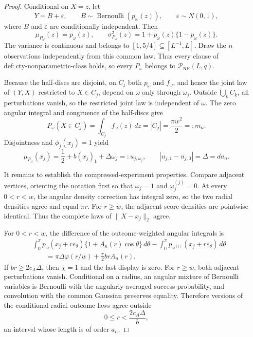 \documentclass{article}
\begin{document}
\begin{proof}
Conditional on \(X=z\), let
\[
 Y=B+\varepsilon,
 \qquad
 B\sim\operatorname{Bernoulli}(p_\omega(z)),
 \qquad
 \varepsilon\sim N(0,1),
\]
where \(B\) and \(\varepsilon\) are conditionally independent.  Then
\[
 \mu_{P_\omega}(z)=p_\omega(z),
 \qquad
 \sigma_{P_\omega}^2(z)=1+p_\omega(z)\{1-p_\omega(z)\}.
\]
The variance is continuous and belongs to \([1,5/4]\subseteq[L^{-1},L]\).  Draw the \(n\) observations independently from this common law.  Thus every clause of \(\mathrm{def:cty\text{-}nonparametric\text{-}class}\) holds, so every \(P_\omega\) belongs to \(\mathcal P_{\mathrm{NP}}(L,q)\).

Because the half-discs are disjoint, on \(C_j\) both \(p_\omega\) and \(f_\omega\), and hence the joint law of \((Y,X)\) restricted to \(X\in C_j\), depend on \(\omega\) only through \(\omega_j\).  Outside \(\bigcup_k C_k\), all perturbations vanish, so the restricted joint law is independent of \(\omega\).  The zero angular integral and congruence of the half-discs give
\[
 P_\omega(X\in C_j)=\int_{C_j}f_\omega(z)\,dz
 =|C_j|=\frac{\pi w^2}{2}=:m_n.
\]
Disjointness and \(\phi_j(x_j)=1\) yield
\[
 \mu_{P_\omega}(x_j)=\frac12+b(x_j)_1+\Delta\omega_j
 =:u_{j,\omega_j},
 \qquad |u_{j,1}-u_{j,0}|=\Delta=d a_n.
\]

It remains to establish the compressed-experiment properties.  Compare adjacent vertices, orienting the notation first so that \(\omega_j=1\) and \(\omega_j^{(j)}=0\).  At every \(0<r<w\), the angular density correction has integral zero, so the two radial densities agree and equal \(\pi r\).  For \(r\geq w\), the adjacent score densities are pointwise identical.  Thus the complete laws of \(\lVert X-x_j\rVert_2\) agree.

For \(0<r<w\), the difference of the outcome-weighted angular integrals is
\[
\begin{aligned}
 &\int_0^\pi p_\omega(x_j+re_\theta)
 \{1+A_n(r)\cos\theta\}\,d\theta
 -\int_0^\pi p_{\omega^{(j)}}(x_j+re_\theta)\,d\theta\\
 &\qquad=\pi\Delta\varphi(r/w)+\frac\pi2brA_n(r).
\end{aligned}
\]
If \(br\geq2c_A\Delta\), then \(\chi=1\) and the last display is zero.  For \(r\geq w\), both adjacent perturbations vanish.  Conditional on a radius, an angular mixture of Bernoulli variables is Bernoulli with the angularly averaged success probability, and convolution with the common Gaussian preserves equality.  Therefore versions of the conditional radial outcome laws agree outside
\[
 0\leq r<\frac{2c_A\Delta}{b},
\]
an interval whose length is of order \(a_n\).


\end{proof}
\end{document}

